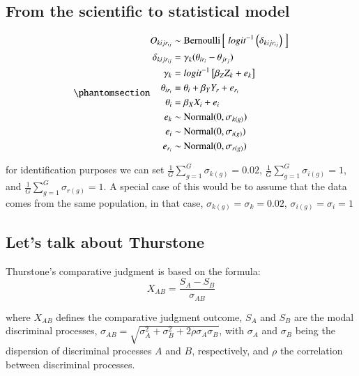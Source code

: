 \documentclass[
  authoryear,
  preprint,
  1p]{elsarticle}
\begin{document}
\subsection{From the scientific to statistical
model}\label{sec-theory-statistics}

\begin{equation}\phantomsection\label{eq-StatModel_general}{
\begin{aligned}
  O_{kijr_{ij}} \sim & \; \text{Bernoulli}\left[ \; logit^{-1}\left( \delta_{kijr_{ij}} \right) \; \right] \\
  \delta_{kijr_{ij}} = & \; \gamma_{k}( \theta_{ir_{i}} - \theta_{jr_{j}} ) \\
  \gamma_{k} = & \; logit^{-1}\left[ \beta_{Z} Z_{k} + e_{k} \right] \\
  \theta_{ir_{i}} = & \; \theta_{i} + \beta_{Y} Y_{r} + e_{r_{i}}  \\
  \theta_{i} = & \; \beta_{X} X_{i} + e_{i}  \\
  e_{k} \sim & \; \text{Normal}(0, \sigma_{k(g)}) \\
  e_{i} \sim & \; \text{Normal}(0, \sigma_{i(g)}) \\
  e_{r_{i}} \sim & \; \text{Normal}(0, \sigma_{r(g)})
\end{aligned}
}\end{equation}

for identification purposes we can set
\(\frac{1}{G}\sum_{g=1}^{G} \sigma_{k(g)} = 0.02\),
\(\frac{1}{G}\sum_{g=1}^{G} \sigma_{i(g)} = 1\), and
\(\frac{1}{G}\sum_{g=1}^{G} \sigma_{r(g)} = 1\). A special case of this
would be to assume that the data comes from the same population, in that
case, \(\sigma_{k(g)} = \sigma_{k} = 0.02\),
\(\sigma_{i(g)} = \sigma_{i} = 1\)

\subsection{Let's talk about Thurstone}\label{sec-theory-thurstone}

Thurstone's comparative judgment \citet{Thurstone_1927} is based on the
formula: \[
X_{AB} = \frac{S_{A} - S_{B}}{\sigma_{AB}}
\]

where \(X_{AB}\) defines the comparative judgment outcome, \(S_{A}\) and
\(S_{B}\) are the modal discriminal processes,
\(\sigma_{AB} = \sqrt{ \sigma^{2}_{A} + \sigma^{2}_{B} + 2 \rho \sigma_{A} \sigma_{B}}\),
with \(\sigma_{A}\) and \(\sigma_{B}\) being the dispersion of
discriminal processes \(A\) and \(B\), respectively, and \(\rho\) the
correlation between discriminal processes.
\end{document}
